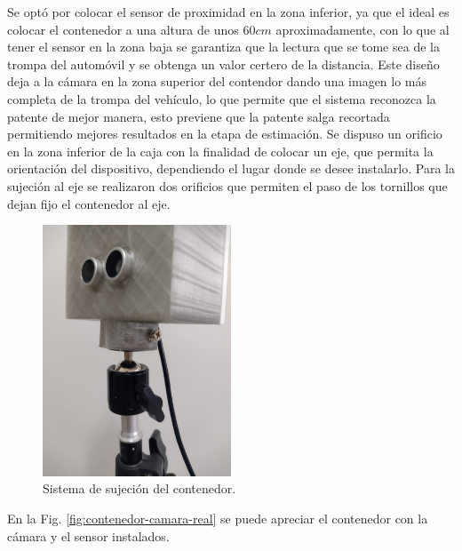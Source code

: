 Se optó por colocar el sensor de proximidad en la zona inferior, ya que el ideal es colocar el contenedor a una altura de unos $60cm$ aproximadamente, con lo que al tener el sensor en la zona baja se garantiza que la lectura que se tome sea de la trompa del automóvil y se obtenga un valor certero de la distancia. Este diseño deja a la cámara en la zona superior del contendor dando una imagen lo más completa de la trompa del vehículo, lo que permite que el sistema reconozca la patente de mejor manera, esto previene que la patente salga recortada permitiendo mejores resultados en la etapa de estimación. Se dispuso un orificio en la zona inferior de la caja con la finalidad de colocar un eje, que permita la orientación del dispositivo, dependiendo
el lugar donde se desee instalarlo.
Para la sujeción al eje se realizaron dos orificios que permiten el paso de los tornillos que dejan fijo el contenedor al eje.
\begin{figure}[bth]
    \centering
    \includegraphics[width=0.5\textwidth]{imgs/sistema-sujecion.jpeg}
    \caption{Sistema de sujeción del contenedor.}
    \label{fig:sujecion-contenedor}
\end{figure}

En la Fig. \ref{fig:contenedor-camara-real} se puede apreciar el contenedor con la cámara y el sensor instalados.

